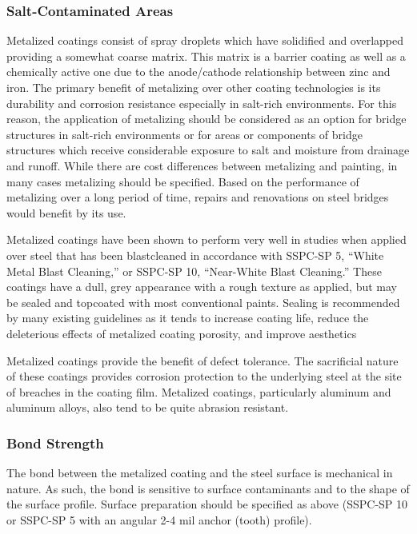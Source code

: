 \subsubsection{Salt-Contaminated Areas}
Metalized coatings consist of spray droplets which have solidified and overlapped providing a somewhat coarse
matrix. This matrix is a barrier coating as well as a chemically active one due to the anode/cathode relationship
between zinc and iron. The primary benefit of metalizing over other coating technologies is its durability and corrosion resistance especially in salt-rich environments. For this reason, the application of metalizing should be
considered as an option for bridge structures in salt-rich environments or for areas or components of bridge structures
which receive considerable exposure to salt and moisture from drainage and runoff. While there are cost differences
between metalizing and painting, in many cases metalizing should be specified. Based on the performance of
metalizing over a long period of time, repairs and renovations on steel bridges would benefit by its use.

Metalized coatings have been shown to perform very well in studies when applied over steel that has been blastcleaned
in accordance with SSPC-SP 5, “White Metal Blast Cleaning,” or SSPC-SP 10, “Near-White Blast
Cleaning.” These coatings have a dull, grey appearance with a rough texture as applied, but may be sealed and
topcoated with most conventional paints. Sealing is recommended by many existing guidelines as it tends to increase
coating life, reduce the deleterious effects of metalized coating porosity, and improve aesthetics 

Metalized coatings provide the benefit of defect tolerance. The sacrificial nature of these coatings provides
corrosion protection to the underlying steel at the site of breaches in the coating film. Metalized coatings, particularly
aluminum and aluminum alloys, also tend to be quite abrasion resistant.

\subsubsection{Bond Strength}
The bond between the metalized coating and the steel surface is mechanical in nature. As such, the bond is
sensitive to surface contaminants and to the shape of the surface profile. Surface preparation should be specified as
above (SSPC-SP 10 or SSPC-SP 5 with an angular 2-4 mil anchor (tooth) profile).

